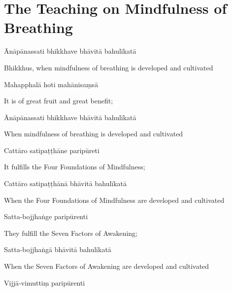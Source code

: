 \section{The Teaching on Mindfulness of Breathing}


\begin{leader}
\end{leader}

Ānāpānassati bhikkhave bhāvitā bahulīkatā

\begin{english}
  Bhikkhus, when mindfulness of breathing is developed and cultivated
\end{english}

Mahapphalā hoti mahānisaṃsā

\begin{english}
  It is of great fruit and great benefit;
\end{english}

Ānāpānassati bhikkhave bhāvitā bahulīkatā

\begin{english}
  When mindfulness of breathing is developed and cultivated
\end{english}

Cattāro satipaṭṭhāne paripūreti

\begin{english}
  It fulfills the Four Foundations of Mindfulness;
\end{english}

Cattāro satipaṭṭhānā bhāvitā bahulīkatā

\begin{english}
  When the Four Foundations of Mindfulness are developed and cultivated
\end{english}

Satta-bojjhaṅge paripūrenti

\begin{english}
  They fulfill the Seven Factors of Awakening;
\end{english}

Satta-bojjhaṅgā bhāvitā bahulīkatā

\begin{english}
  When the Seven Factors of Awakening are developed and cultivated
\end{english}

Vijjā-vimuttiṃ paripūrenti

